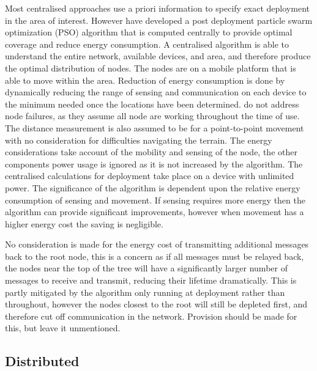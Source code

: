 \documentclass[authoryearcitations]{UoYCSproject}
\begin{document}
%

Most centralised approaches use a priori information to specify exact deployment in the area of interest. However \citet*{Qu2012} have developed a post deployment particle swarm optimization (PSO) algorithm that is computed centrally to provide optimal coverage and reduce energy consumption. A centralised algorithm is able to understand the entire network, available devices, and area, and therefore produce the optimal distribution of nodes. The nodes are on a mobile platform that is able to move within the area. Reduction of energy consumption is done by dynamically reducing the range of sensing and communication on each device to the minimum needed once the locations have been determined. \citeauthor*{Qu2012} do not address node failures, as they assume all node are working throughout the time of use. The distance measurement is also assumed to be for a point-to-point movement with no consideration for difficulties navigating the terrain. The energy considerations take account of the mobility and sensing of the node, the other components power usage is ignored as it is not increased by the algorithm. The centralised calculations for deployment take place on a device with unlimited power. The significance of the algorithm is dependent upon the relative energy consumption of sensing and movement. If sensing requires more energy then the algorithm can provide significant improvements, however when movement has a higher energy cost the saving is negligible.

No consideration is made for the energy cost of transmitting additional messages back to the root node, this is a concern as if all messages must be relayed back, the nodes near the top of the tree will have a significantly larger number of messages to receive and transmit, reducing their lifetime dramatically. This is partly mitigated by the algorithm only running at deployment rather than throughout, however the nodes closest to the root will still be depleted first, and therefore cut off communication in the network. Provision should be made for this, but \citeauthor*{Qu2012} leave it unmentioned.

%
%

\subsection{Distributed}
\end{document}
